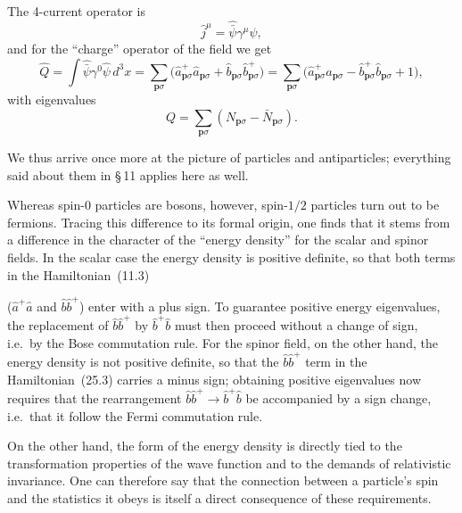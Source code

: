 The 4-current operator is
\begin{equation}
\widehat j^\mu = \widehat{\bar\psi}\gamma^\mu\widehat\psi,
\tag{25.7}
\end{equation}
and for the ``charge'' operator of the field we get
\[
\widehat Q = \int \widehat{\bar\psi}\gamma^0\widehat\psi\,d^3x = \sum_{\mathbf{p}\sigma}\bigl(\widehat a^+_{\mathbf{p}\sigma}\widehat a_{\mathbf{p}\sigma} + \widehat b_{\mathbf{p}\sigma}\widehat b^+_{\mathbf{p}\sigma}\bigr) = \sum_{\mathbf{p}\sigma}\bigl(\widehat a^+_{\mathbf{p}\sigma}\widehat a_{\mathbf{p}\sigma} - \widehat b^+_{\mathbf{p}\sigma}\widehat b_{\mathbf{p}\sigma} + 1\bigr),
\]
\begin{equation}
\tag{25.8}
\end{equation}
with eigenvalues
\begin{equation}
Q = \sum_{\mathbf{p}\sigma}(N_{\mathbf{p}\sigma} - \bar N_{\mathbf{p}\sigma}).
\tag{25.9}
\end{equation}

We thus arrive once more at the picture of particles and antiparticles; everything said about them in \S\,11 applies here as well.

Whereas spin-0 particles are bosons, however, spin-$1/2$ particles turn out to be fermions. Tracing this difference to its formal origin, one finds that it stems from a difference in the character of the ``energy density'' for the scalar and spinor fields. In the scalar case the energy density is positive definite, so that both terms in the Hamiltonian~(11.3)

($\widehat a^+\widehat a$ and $\widehat b\widehat b^+$) enter with a plus sign. To guarantee positive energy eigenvalues, the replacement of $\widehat b\widehat b^+$ by $\widehat b^+\widehat b$ must then proceed without a change of sign, i.e.\ by the Bose commutation rule. For the spinor field, on the other hand, the energy density is not positive definite, so that the $\widehat b\widehat b^+$ term in the Hamiltonian~(25.3) carries a minus sign; obtaining positive eigenvalues now requires that the rearrangement $\widehat b\widehat b^+ \to \widehat b^+\widehat b$ be accompanied by a sign change, i.e.\ that it follow the Fermi commutation rule.

On the other hand, the form of the energy density is directly tied to the transformation properties of the wave function and to the demands of relativistic invariance. One can therefore say that the connection between a particle's spin and the statistics it obeys is itself a direct consequence of these requirements.

